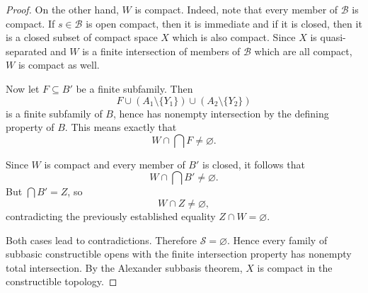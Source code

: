 \documentclass{article}
\begin{document}
\begin{proof}
On the other hand, \(W\) is compact. Indeed, note that every member of \(\mathcal B\) is compact. If \(s \in \mathcal B\) is open compact, then it is immediate and if it is closed, then it is a closed subset of compact space \(X\) which is also compact. Since \(X\) is quasi-separated and \(W\) is a finite intersection of members of
\(\mathcal B\) which are all compact, \(W\) is compact as well.

Now let \(F \subseteq B'\) be a finite subfamily. Then
\[
F \cup (A_1 \setminus \{Y_1\}) \cup (A_2 \setminus \{Y_2\})
\]
is a finite subfamily of \(B\), hence has nonempty intersection by the defining property of
\(B\). This means exactly that
\[
W \cap \bigcap F \neq \varnothing.
\]

Since \(W\) is compact and every member of \(B'\) is closed, it follows that
\[
W \cap \bigcap B' \neq \varnothing.
\]
But \(\bigcap B' = Z\), so
\[
W \cap Z \neq \varnothing,
\]
contradicting the previously established equality \(Z \cap W = \varnothing\).

Both cases lead to contradictions. Therefore \(\mathcal S = \varnothing\). Hence every family
of subbasic constructible opens with the finite intersection property has nonempty total
intersection. By the Alexander subbasis theorem, \(X\) is compact in the constructible topology.
\end{proof}
\end{document}
